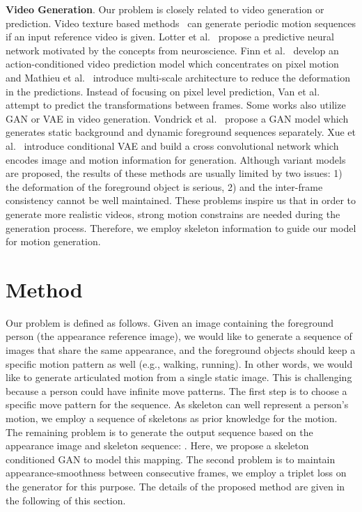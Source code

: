 \documentclass[journal]{IEEEtran}
\begin{document}
\textbf{Video Generation}. Our problem is closely related to video generation or prediction.
Video texture based methods~\cite{schodl2000video,agarwala2005panoramic,liao2013automated} can generate periodic motion sequences if an input reference video is given.
Lotter et al.~\cite{DBLP:journals/corr/LotterKC16} propose a predictive neural network motivated by the concepts from neuroscience.
Finn et al.~\cite{finn2016unsupervised} develop an action-conditioned video prediction model which concentrates on pixel motion and Mathieu et al.~\cite{DBLP:journals/corr/MathieuCL15} introduce multi-scale architecture to reduce the deformation in the predictions. Instead of focusing on pixel level prediction, Van et al.~\cite{van2017transformation} attempt to predict the transformations between frames. Some works also utilize GAN or VAE in video generation. Vondrick et al.~\cite{DBLP:conf/nips/VondrickPT16} propose a GAN model which generates static background and dynamic foreground sequences separately. Xue et al.~\cite{xue2016visual} introduce conditional VAE and build a cross convolutional network which encodes image and motion information for generation. Although variant models are proposed, the results of these methods are usually limited by two issues: 1) the deformation of the foreground object is serious, 2) and the inter-frame consistency cannot be well maintained. These problems inspire us that in order to generate more realistic videos, strong motion constrains are needed during the generation process. Therefore, we employ skeleton information to guide our model for motion generation.



\section{Method}
Our problem is defined as follows. Given an image  containing the foreground person (the appearance reference image), we would like to generate a sequence of images  that share the same appearance, and the foreground objects should keep a specific motion pattern as well (e.g., walking, running). In other words, we would like to generate articulated motion from a single static image.
This is challenging because a person could have infinite move patterns. The first step is to choose a specific move pattern for the sequence. As skeleton can well represent a person's motion, we employ a sequence of skeletons  as prior knowledge for the motion. The remaining problem is to generate the output sequence based on the appearance image and skeleton sequence: . Here, we propose a skeleton conditioned GAN to model this mapping.
The second problem is to maintain appearance-smoothness between consecutive frames, we employ a triplet loss on the generator for this purpose.
The details of the proposed method are given in the following of this section.
\end{document}
